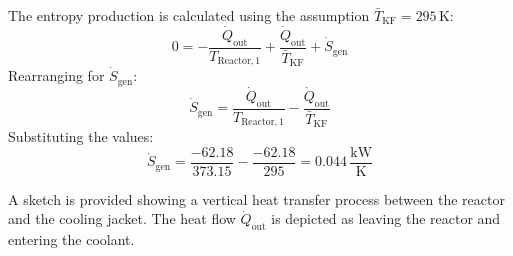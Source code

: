 The entropy production is calculated using the assumption \( \bar{T}_{\text{KF}} = 295 \, \text{K} \):  
\[
0 = -\frac{\dot{Q}_{\text{out}}}{T_{\text{Reactor},1}} + \frac{\dot{Q}_{\text{out}}}{\bar{T}_{\text{KF}}} + \dot{S}_{\text{gen}}
\]  
Rearranging for \( \dot{S}_{\text{gen}} \):  
\[
\dot{S}_{\text{gen}} = \frac{\dot{Q}_{\text{out}}}{T_{\text{Reactor},1}} - \frac{\dot{Q}_{\text{out}}}{\bar{T}_{\text{KF}}}
\]  
Substituting the values:  
\[
\dot{S}_{\text{gen}} = \frac{-62.18}{373.15} - \frac{-62.18}{295} = 0.044 \, \frac{\text{kW}}{\text{K}}
\]  

A sketch is provided showing a vertical heat transfer process between the reactor and the cooling jacket. The heat flow \( \dot{Q}_{\text{out}} \) is depicted as leaving the reactor and entering the coolant.